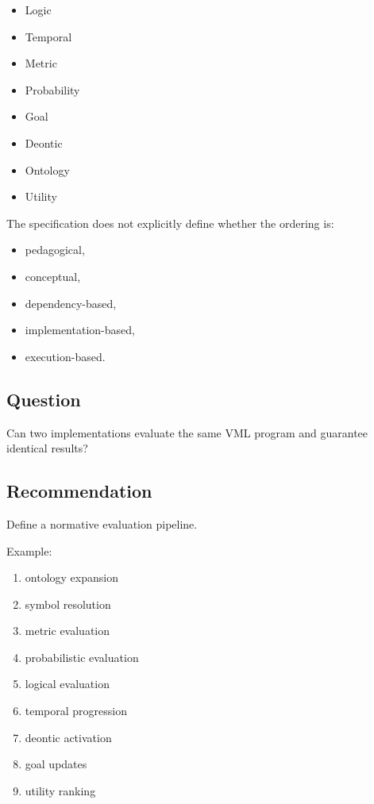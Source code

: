 \documentclass[a4paper,11pt]{article}
\begin{document}
\begin{itemize}
\item Logic
\item Temporal
\item Metric
\item Probability
\item Goal
\item Deontic
\item Ontology
\item Utility
\end{itemize}

The specification does not explicitly define whether the ordering
is:

\begin{itemize}
\item pedagogical,
\item conceptual,
\item dependency-based,
\item implementation-based,
\item execution-based.
\end{itemize}

\subsection{Question}

Can two implementations evaluate the same VML program
and guarantee identical results?

\subsection{Recommendation}

Define a normative evaluation pipeline.

Example:

\begin{enumerate}
\item ontology expansion
\item symbol resolution
\item metric evaluation
\item probabilistic evaluation
\item logical evaluation
\item temporal progression
\item deontic activation
\item goal updates
\item utility ranking
\end{enumerate}
\end{document}
